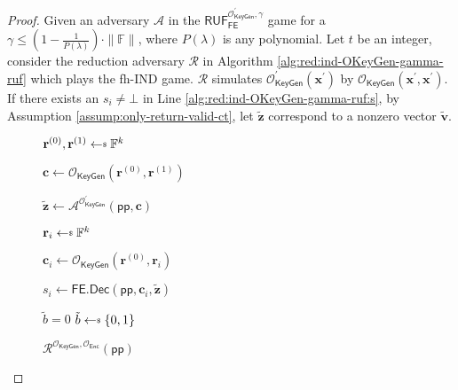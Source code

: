\begin{proof}
Given an adversary $\mathcal{A}$ in the $\textsf{RUF}^{\mathcal{O}^\prime_{\textsf{KeyGen}}, \gamma}_{\textsf{FE}}$ game for a $\gamma \leq (1 - \frac{1}{P(\lambda)}) \cdot \|\mathbb{F}\|$, where $P(\lambda)$ is any polynomial. Let $t$ be an integer, consider the reduction adversary $\mathcal{R}$ in Algorithm \ref{alg:red:ind-OKeyGen-gamma-ruf} which plays the \textsf{fh-IND} game. $\mathcal{R}$ simulates $\mathcal{O}_\textsf{KeyGen}^\prime(\mathbf{x}^\prime)$ by $\mathcal{O}_\textsf{KeyGen}(\mathbf{x}^\prime, \mathbf{x}^\prime)$.
If there exists an $s_i \neq \bot$ in Line \ref{alg:red:ind-OKeyGen-gamma-ruf:s}, by Assumption \ref{assump:only-return-valid-ct}, let $\mathbf{\tilde{z}}$ correspond to a nonzero vector $\mathbf{\tilde{v}}$.

\begin{figure}[h]
\centering
	
	\begin{minipage}[t]{0.5\linewidth}
	\centering
	\begin{algorithm}[H]
	\caption{$\mathcal{R}^{\mathcal{O}_{\textsf{KeyGen}}, \mathcal{O}_{\textsf{Enc}}}(\textsf{pp})$}
	\label{alg:red:ind-OKeyGen-gamma-ruf}
	\begin{algorithmic}[1]
		\State $\mathbf{r}^{(0)}, \mathbf{r}^{(1)} \getsdollar \mathbb{F}^{k}$
		
		\State $\mathbf{c} \gets \mathcal{O}_{\textsf{KeyGen}}(\mathbf{r}^{(0)}, \mathbf{r}^{(1)})$ 

		\State ${\mathbf{\tilde{z}}} \gets {\mathcal{A}}^{\mathcal{O}^\prime_{\textsf{KeyGen}}} (\textsf{pp}, \mathbf{c})$

		
			\State $\mathbf{r}_i \getsdollar \mathbb{F}^{k}$

			\State $\mathbf{c}_i \gets \mathcal{O}_{\textsf{KeyGen}}(\mathbf{r}^{(0)}, \mathbf{r}_i)$

			\State $s_i \gets \textsf{FE.Dec}( \textsf{pp}, \mathbf{c}_i, \mathbf{\tilde{z}} )$ \label{alg:red:ind-OKeyGen-gamma-ruf:s}
	
		\EndFor	
		
		 \label{alg:red:ind-OKeyGen-gamma-ruf:verify}
			\State \Return $\tilde{b} = 0$
		\Else
			\State \Return $\tilde{b} \getsdollar \{0, 1\}$
		\EndIf

	\end{algorithmic}
	\end{algorithm}
	\end{minipage}
	

\end{figure}
\end{proof}

